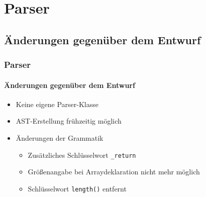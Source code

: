 \section{Parser}

\subsection{Änderungen gegenüber dem Entwurf}
\begin{frame}
\frametitle{Parser}
\framesubtitle{Änderungen gegenüber dem Entwurf}
\begin{itemize}
	\item<+-> Keine eigene Parser-Klasse
	\item<+-> AST-Erstellung frühzeitig möglich
	\item<+-> Änderungen der Grammatik
	\begin{itemize}
		\item<+-> Zusätzliches Schlüsselwort \texttt{\_return}
		\item<+-> Größenangabe bei Arraydeklaration nicht mehr möglich
		\item<+-> Schlüsselwort \texttt{length()} entfernt
	\end{itemize}
\end{itemize}
\end{frame}

